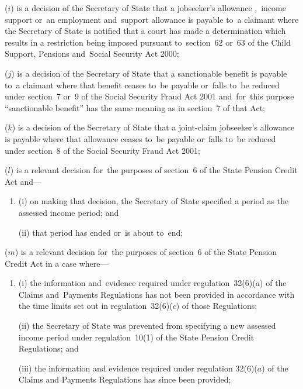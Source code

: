 \documentclass[12pt,a4paper]{article}
\begin{document}
\begin{enumerate}
($i$) is a decision of the Secretary of State that a jobseeker’s allowance%
,~income support or~an employment and~support allowance  %
is payable to~a claimant where the Secretary of State is notified that a court has made a determination which results in a restriction being imposed pursuant to~section~62 or~63 of the Child Support, Pensions and~Social Security Act 2000;

($j$) is a decision of the Secretary of State that a sanctionable benefit is payable to~a claimant where that benefit ceases to~be payable or~falls to~be reduced under section~7 or~9 of the Social Security Fraud Act 2001 and~for~this purpose “sanctionable benefit” has the same meaning as in section~7 of that Act;

($k$) is a decision of the Secretary of State that a joint-claim jobseeker’s allowance is payable where that allowance ceases to~be payable or~falls to~be reduced under section~8 of the Social Security Fraud Act 2001;

($l$) is a relevant decision for~the purposes of section~6 of the State Pension Credit Act and—
\begin{enumerate}\item[]
(i) on making that decision, the Secretary of State specified a period as the assessed income period; and

(ii) that period has ended or~is about to~end;
\end{enumerate}

($m$) is a relevant decision for~the purposes of section~6 of the State Pension Credit Act in a case where—
\begin{enumerate}\item[]
(i) the information and~evidence required under regulation~32(6)($a$)  of the Claims and~Payments Regulations has not been provided in accordance with the time limits set out in regulation~32(6)($c$)  of those Regulations;

(ii) the Secretary of State was prevented from specifying a new assessed income period under regulation~10(1) of the State Pension Credit Regulations; and

\begin{sloppypar}
(iii) the information and evidence required under regulation 32(6)($a$)  of the Claims and Payments Regulations has since been provided;
\end{sloppypar}
\end{enumerate}


\end{enumerate}
\end{document}
